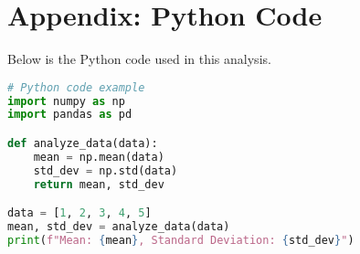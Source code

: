 
\section{Appendix: Python Code}
Below is the Python code used in this analysis.

\begin{lstlisting}[language=Python, caption=Python Code for Analysis]
# Python code example
import numpy as np
import pandas as pd

def analyze_data(data):
    mean = np.mean(data)
    std_dev = np.std(data)
    return mean, std_dev

data = [1, 2, 3, 4, 5]
mean, std_dev = analyze_data(data)
print(f"Mean: {mean}, Standard Deviation: {std_dev}")
\end{lstlisting}
